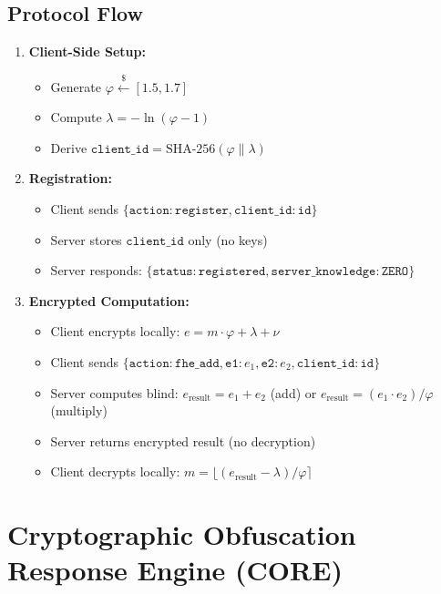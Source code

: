 \documentclass{article}
\begin{document}
\subsection{Protocol Flow}

\begin{enumerate}
    \item \textbf{Client-Side Setup:}
    \begin{itemize}
        \item Generate $\varphi \xleftarrow{\$} [1.5, 1.7]$
        \item Compute $\lambda = -\ln(\varphi - 1)$
        \item Derive $\texttt{client\_id} = \text{SHA-256}(\varphi \| \lambda)$
    \end{itemize}
    
    \item \textbf{Registration:}
    \begin{itemize}
        \item Client sends $\{\texttt{action}: \texttt{register}, \texttt{client\_id}: \texttt{id}\}$
        \item Server stores $\texttt{client\_id}$ only (no keys)
        \item Server responds: $\{\texttt{status}: \texttt{registered}, \texttt{server\_knowledge}: \texttt{ZERO}\}$
    \end{itemize}
    
    \item \textbf{Encrypted Computation:}
    \begin{itemize}
        \item Client encrypts locally: $e = m \cdot \varphi + \lambda + \nu$
        \item Client sends $\{\texttt{action}: \texttt{fhe\_add}, \texttt{e1}: e_1, \texttt{e2}: e_2, \texttt{client\_id}: \texttt{id}\}$
        \item Server computes blind: $e_{\text{result}} = e_1 + e_2$ (add) or $e_{\text{result}} = (e_1 \cdot e_2)/\varphi$ (multiply)
        \item Server returns encrypted result (no decryption)
        \item Client decrypts locally: $m = \lfloor (e_{\text{result}} - \lambda) / \varphi \rceil$
    \end{itemize}
\end{enumerate}

\section{Cryptographic Obfuscation Response Engine (CORE)}
\end{document}
